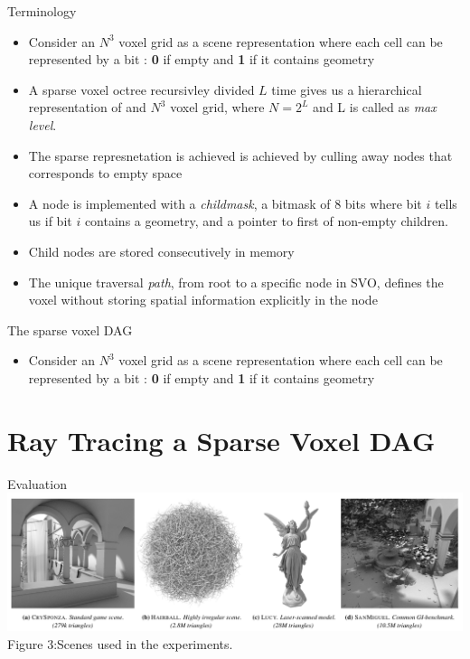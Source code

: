 \documentclass{beamer}
\begin{document}
\begin{frame}{Terminology}
	\begin{itemize}
		\item{
		Consider an $N^3$ voxel grid as a scene representation where each cell can be represented by a bit : \textbf{0} if empty and \textbf{1} if it contains geometry
		}
		\item{
			A sparse voxel octree recursivley divided $L$ time gives us a hierarchical representation of and $N^3$ voxel grid, where $N = 2^L$ and L is called as \textit{max level}.
		}
		\item{
			The sparse represnetation is achieved is achieved by culling away nodes that corresponds to empty space
		}
		\item{
			A node is implemented with a \textit{childmask}, a bitmask of 8 bits where bit $i$ tells us if bit $i$  contains a geometry, and a pointer to first of non-empty children.
		}
		\item{
			Child nodes are stored consecutively in memory	
		}
		\item{
			The unique traversal \textit{path}, from root to a specific node in SVO, defines the voxel without storing spatial information explicitly in the node 
		}
	\end{itemize}
\end{frame}


\begin{frame}{The sparse voxel DAG}
	\begin{itemize}
		\item{
		Consider an $N^3$ voxel grid as a scene representation where each cell can be represented by a bit : \textbf{0} if empty and \textbf{1} if it contains geometry
		}
		
	\end{itemize}
\end{frame}

\section{Ray Tracing a Sparse Voxel DAG}

\begin{frame}{Evaluation}
	\includegraphics[scale=0.26]{images/scenes.png}{\\Figure 3:Scenes used in the experiments.}
\end{frame}
\end{document}
